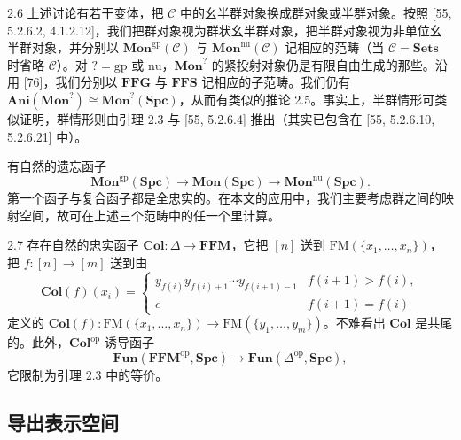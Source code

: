 \begin{rem}{2.6}\label{rem:a2-2-6}
上述讨论有若干变体，把 $\mathcal C$ 中的幺半群对象换成群对象或半群对象。按照 [55, 5.2.6.2, 4.1.2.12]，我们把群对象视为群状幺半群对象，把半群对象视为非单位幺半群对象，并分别以 $\mathbf{Mon}^{\mathrm{gp}}(\mathcal C)$ 与 $\mathbf{Mon}^{\mathrm{nu}}(\mathcal C)$ 记相应的范畴（当 $\mathcal C=\mathbf{Sets}$ 时省略 $\mathcal C$）。对 $?=\mathrm{gp}$ 或 $\mathrm{nu}$，$\mathbf{Mon}^{?}$ 的紧投射对象仍是有限自由生成的那些。沿用 [76]，我们分别以 $\mathbf{FFG}$ 与 $\mathbf{FFS}$ 记相应的子范畴。我们仍有 $\mathbf{Ani}(\mathbf{Mon}^{?})\cong\mathbf{Mon}^{?}(\mathbf{Spc})$，从而有类似的推论 2.5。事实上，半群情形可类似证明，群情形则由引理 2.3 与 [55, 5.2.6.4] 推出（其实已包含在 [55, 5.2.6.10, 5.2.6.21] 中）。

有自然的遗忘函子
\[
\mathbf{Mon}^{\mathrm{gp}}(\mathbf{Spc})\to\mathbf{Mon}(\mathbf{Spc})\to\mathbf{Mon}^{\mathrm{nu}}(\mathbf{Spc}).
\]
第一个函子与复合函子都是全忠实的。在本文的应用中，我们主要考虑群之间的映射空间，故可在上述三个范畴中的任一个里计算。
\end{rem}

\begin{rem}{2.7}\label{rem:a2-2-7}
存在自然的忠实函子 $\mathbf{Col}:\Delta\to\mathbf{FFM}$，它把 $[n]$ 送到 $\mathrm{FM}(\{x_1,\dots,x_n\})$，把 $f:[n]\to[m]$ 送到由
\[
\mathbf{Col}(f)(x_i)=
\begin{cases}
y_{f(i)}y_{f(i)+1}\cdots y_{f(i+1)-1} & f(i+1)>f(i),\\[0.2em]
e & f(i+1)=f(i)
\end{cases}
\]
定义的 $\mathbf{Col}(f):\mathrm{FM}(\{x_1,\dots,x_n\})\to\mathrm{FM}(\{y_1,\dots,y_m\})$。不难看出 $\mathbf{Col}$ 是共尾的。此外，$\mathbf{Col}^{\mathrm{op}}$ 诱导函子
\[
\mathbf{Fun}(\mathbf{FFM}^{\mathrm{op}},\mathbf{Spc})\to\mathbf{Fun}(\Delta^{\mathrm{op}},\mathbf{Spc}),
\]
它限制为引理 2.3 中的等价。
\end{rem}

\subsection{导出表示空间}

